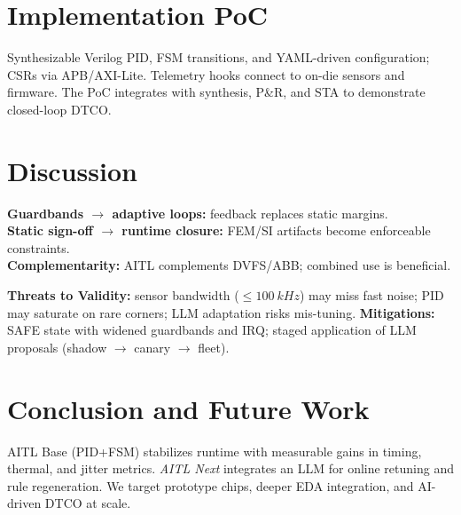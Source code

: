 \documentclass[conference]{IEEEtran}
\begin{document}
\section{Implementation PoC}
Synthesizable Verilog PID, FSM transitions, and YAML-driven configuration; CSRs via APB/AXI-Lite. Telemetry hooks connect to on-die sensors and firmware. The PoC integrates with synthesis, P\&R, and STA to demonstrate closed-loop DTCO.

\section{Discussion}
\textbf{Guardbands $\rightarrow$ adaptive loops:} feedback replaces static margins.\\
\textbf{Static sign-off $\rightarrow$ runtime closure:} FEM/SI artifacts become enforceable constraints.\\
\textbf{Complementarity:} AITL complements DVFS/ABB; combined use is beneficial.

\textbf{Threats to Validity:} sensor bandwidth ($\leq\SI{100}{kHz}$) may miss fast noise; PID may saturate on rare corners; LLM adaptation risks mis-tuning. \textbf{Mitigations:} SAFE state with widened guardbands and IRQ; staged application of LLM proposals (shadow $\rightarrow$ canary $\rightarrow$ fleet).

\section{Conclusion and Future Work}
AITL Base (PID+FSM) stabilizes runtime with measurable gains in timing, thermal, and jitter metrics. \emph{AITL Next} integrates an LLM for online retuning and rule regeneration. We target prototype chips, deeper EDA integration, and AI-driven DTCO at scale.
\end{document}
